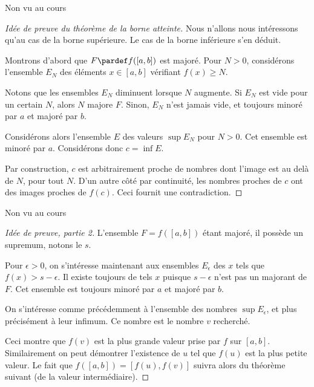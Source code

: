 \begin{frame}{Non vu au cours}%
\begin{proof}[Idée de preuve du théorème de la borne atteinte]
  Nous n'allons nous intéressons qu'au cas de la borne supérieure. Le cas de la borne inférieure s'en déduit.\pause

    Montrons d'abord que \(F \pardef f([a,b])\) est majoré. Pour \(N > 0\), considérons l'ensemble \(E_{N}\) des éléments \(x \in [a,b]\) vérifiant \(f(x) \geq N\).\pause

    Notons que les ensembles \(E_{N}\) diminuent lorsque \(N\) augmente. Si \(E_{N}\) est vide pour un certain \(N\), alors \(N\) majore \(F\). Sinon, \(E_{N}\) n'est jamais vide, et toujours minoré par \(a\) et majoré par \(b\).\pause

    Considérons alors l'ensemble \(E\) des valeurs \(\sup E_{N}\) pour \(N > 0\). Cet ensemble est minoré par \(a\). Considérons donc \(c = \inf E\).\pause

    Par construction, \(c\) est arbitrairement proche de nombres dont l'image est au delà de \(N\), pour tout \(N\). D'un autre côté par continuité, les nombres proches de \(c\) ont des images proches de \(f(c)\). Ceci fournit une contradiction.\noqed
\end{proof}
\end{frame}
\begin{frame}{Non vu au cours}%
  \begin{proof}[Idée de preuve, partie 2]
    L'ensemble \(F = f([a,b])\) étant majoré, il possède un supremum, notons le \(s\).\pause

    Pour \(\epsilon > 0\), on s'intéresse maintenant aux ensembles \(E_{\epsilon}\) des \(x\) tels que \(f(x) > s - \epsilon\). Il existe toujours de tels \(x\) puisque \(s - \epsilon\) n'est pas un majorant de \(F\). Cet ensemble est toujours minoré par \(a\) et majoré par \(b\).\pause

    On s'intéresse comme précédemment à l'ensemble des nombres \(\sup E_{\epsilon}\), et plus précisément à leur infimum. Ce nombre est le nombre \(v\) recherché.\pause

    Ceci montre que \(f(v)\) est la plus grande valeur prise par \(f\) sur \([a,b]\). Similairement on peut démontrer l'existence de \(u\) tel que \(f(u)\) est la plus petite valeur. Le fait que \(f([a,b]) = [f(u), f(v)]\) suivra alors du théorème suivant (de la valeur intermédiaire).
  \end{proof}
\end{frame}
